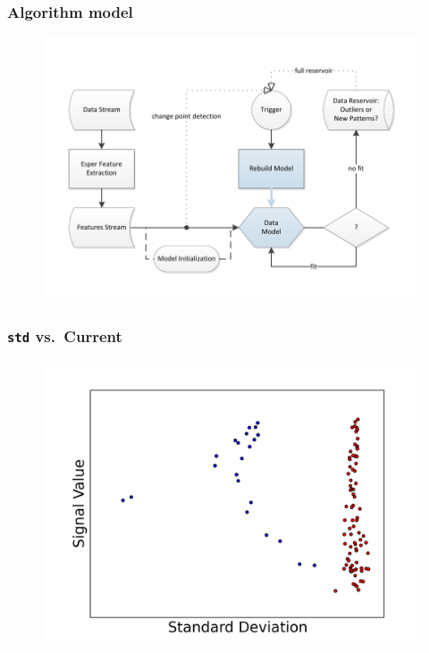 \documentclass{beamer}
\begin{document}
  \begin{frame}[foot]
    \frametitle{Algorithm model} 
    \begin{figure}[htbp]
      \includegraphics[width=\textwidth]{./gfx/APC_Presentation.pdf}
    \end{figure}
  \end{frame}

  \begin{frame}[foot]
    \frametitle{\texttt{std} vs.\ Current} 
    \begin{figure}
      \includegraphics[scale=.5]{./gfx/f2f5.png}
    \end{figure}
  \end{frame}
\end{document}
